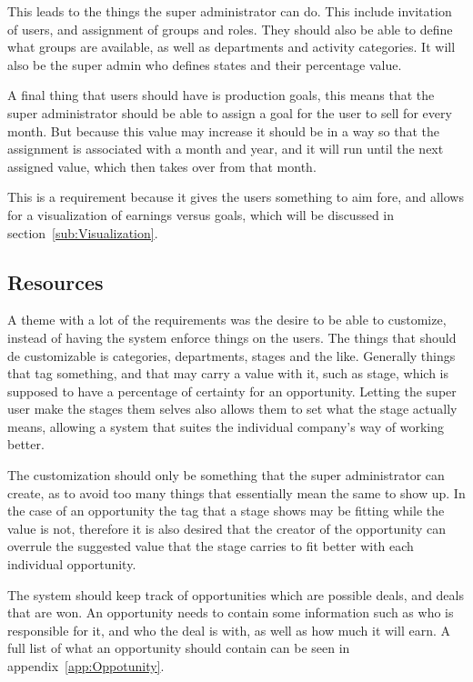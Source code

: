 This leads to the things the super administrator can do. This include invitation of users, and assignment of groups and roles. They should also be able to define what groups are available, as well as departments and activity categories. It will also be the super admin who defines states and their percentage value.

A final thing that users should have is production goals, this means that the super administrator should be able to assign a goal for the user to sell for every month. But because this value may increase it should be in a way so that the assignment is associated with a month and year, and it will run until the next assigned value, which then takes over from that month.

This is a requirement because it gives the users something to aim fore, and allows for a visualization of earnings versus goals, which will be discussed in section~\ref{sub:Visualization}.

\subsection{Resources}
\label{sub:Resources}

A theme with a lot of the requirements was the desire to be able to customize, instead of having the system enforce things on the users. The things that should de customizable is categories, departments, stages and the like. Generally things that tag something, and that may carry a value with it, such as stage, which is supposed to have a percentage of certainty for an opportunity. Letting the super user make the stages them selves also allows them to set what the stage actually means, allowing a system that suites the individual company's way of working better.

The customization should only be something that the super administrator can create, as to avoid too many things that essentially mean the same to show up. In the case of an opportunity the tag that a stage shows may be fitting while the value is not, therefore it is also desired that the creator of the opportunity can overrule the suggested value that the stage carries to fit better with each individual opportunity.

The system should keep track of opportunities which are possible deals, and deals that are won. An opportunity needs to contain some information such as who is responsible for it, and who the deal is with, as well as how much it will earn. A full list of what an opportunity should contain can be seen in appendix~\ref{app:Oppotunity}.

